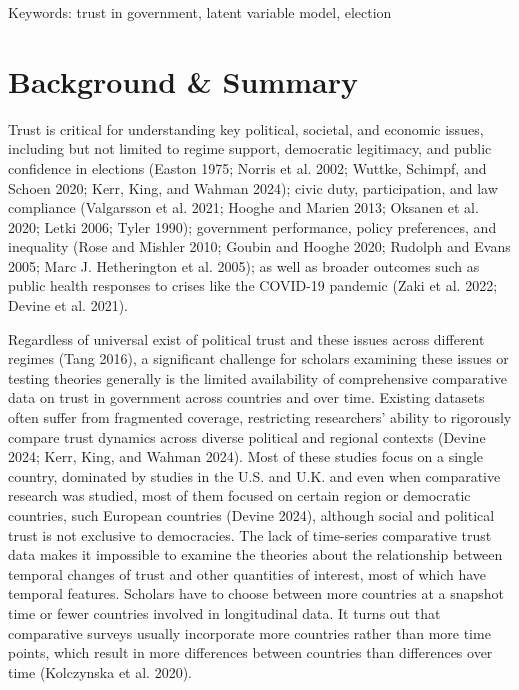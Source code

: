 \documentclass[
  12pt,
]{article}
\begin{document}
Keywords: trust in government, latent variable model, election

\pagebreak


\section{Background \& Summary}\label{background-summary}

Trust is critical for understanding key political, societal, and economic issues, including but not limited to regime support, democratic legitimacy, and public confidence in elections (Easton 1975; Norris et al. 2002; Wuttke, Schimpf, and Schoen 2020; Kerr, King, and Wahman 2024); civic duty, participation, and law compliance (Valgarsson et al. 2021; Hooghe and Marien 2013; Oksanen et al. 2020; Letki 2006; Tyler 1990); government performance, policy preferences, and inequality (Rose and Mishler 2010; Goubin and Hooghe 2020; Rudolph and Evans 2005; Marc J. Hetherington et al. 2005); as well as broader outcomes such as public health responses to crises like the COVID-19 pandemic (Zaki et al. 2022; Devine et al. 2021).

Regardless of universal exist of political trust and these issues across different regimes (Tang 2016), a significant challenge for scholars examining these issues or testing theories generally is the limited availability of comprehensive comparative data on trust in government across countries and over time.
Existing datasets often suffer from fragmented coverage, restricting researchers' ability to rigorously compare trust dynamics across diverse political and regional contexts (Devine 2024; Kerr, King, and Wahman 2024).
Most of these studies focus on a single country, dominated by studies in the U.S. and U.K. and even when comparative research was studied, most of them focused on certain region or democratic countries, such European countries (Devine 2024), although social and political trust is not exclusive to democracies.
The lack of time-series comparative trust data makes it impossible to examine the theories about the relationship between temporal changes of trust and other quantities of interest, most of which have temporal features. Scholars have to choose between more countries at a snapshot time or fewer countries involved in longitudinal data.
It turns out that comparative surveys usually incorporate more countries rather than more time points, which result in more differences between countries than differences over time (Kolczynska et al. 2020).
\end{document}
